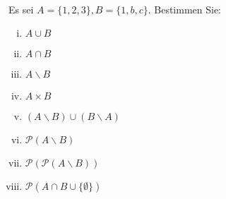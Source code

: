 \newcommand{\printpraesenzlsg}{false}
\newcommand{\printloesungen}{true}
\newcommand{\printbewertungen}{false}
\newcommand{\blattnummer}{4}



\iforiginal{}

	

\\
Es sei $A=\{1,2,3\}, B=\{1,b,c\}$. Bestimmen Sie:
\begin{enumerate}[(i)]
\item $A\cup B$
\item $A\cap B$
\item $A\backslash B$
\item $A\times B$
\item $(A\backslash B)\cup (B\backslash A)$
\item $\mathscr{P}(A\backslash B)$
\item $\mathscr{P}(\mathscr{P}(A\backslash B))$
\item $\mathscr{P}(A\cap B\cup\{\emptyset\})$

\end{enumerate}

